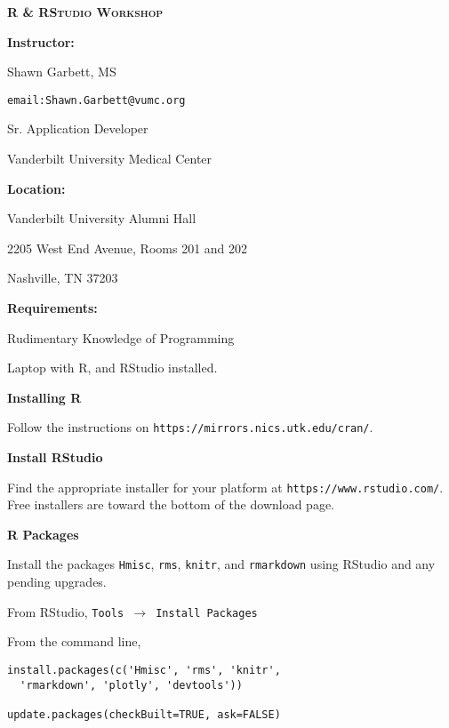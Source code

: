 \documentclass[twocolumn]{article}
\begin{document}
\textbf{\LARGE{\textsc{R \& RStudio Workshop}}}


\vspace*{\fill}

\begin{flushleft}

\textbf{Instructor:}

Shawn Garbett, MS

\texttt{email:Shawn.Garbett@vumc.org}

Sr. Application Developer

Vanderbilt University Medical Center
\end{flushleft}

\vspace*{\fill}

\begin{flushleft}
\textbf{Location:}

Vanderbilt University Alumni Hall

2205 West End Avenue, Rooms 201 and 202

Nashville, TN 37203
\end{flushleft}

\vspace*{\fill}

\begin{flushleft}

\textbf{Requirements:}

Rudimentary Knowledge of Programming

Laptop with R, and RStudio installed.

\end{flushleft}

\vspace*{\fill}

\begin{flushleft}

\textbf{Installing R}

Follow the instructions on \texttt{https://mirrors.nics.utk.edu/cran/}.

\textbf{Install RStudio}

Find the appropriate installer for your platform at \texttt{https://www.rstudio.com/}. Free installers are toward the bottom of the download page.

\textbf{R Packages}

Install the packages \texttt{Hmisc}, \texttt{rms}, \texttt{knitr}, and \texttt{rmarkdown} using RStudio and any pending upgrades.

From RStudio, \texttt{Tools $\rightarrow$ Install Packages}

From the command line,

\begin{framed}
\begin{verbatim}
install.packages(c('Hmisc', 'rms', 'knitr',
  'rmarkdown', 'plotly', 'devtools'))
  
update.packages(checkBuilt=TRUE, ask=FALSE)
\end{verbatim}
\end{framed}

\end{flushleft}
\end{document}
